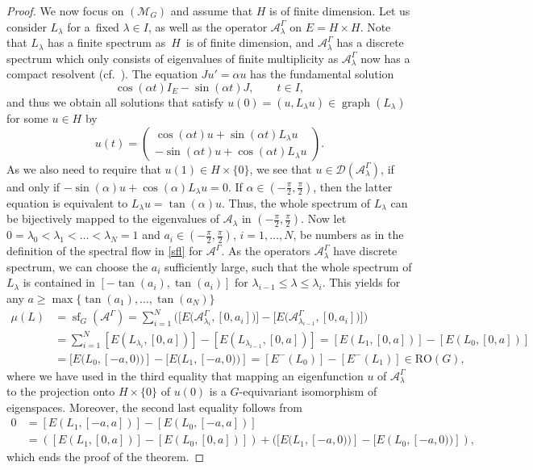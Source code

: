 \documentclass[pdftex]{sigma}
\numberwithin{equation}{section}
\theoremstyle{definition}
\DeclareMathOperator{\sfl}{sf}
\DeclareMathOperator{\gra}{graph}
\begin{document}
\begin{proof}
We now focus on $(\mathcal{M}_G)$ and assume that $H$ is of finite dimension. Let us consider $L_\lambda$ for a~fixed $\lambda\in I$, as well as the operator $\mathcal{A}^\Gamma_\lambda$ on $E=H\times H$. Note that $L_\lambda$ has a finite spectrum as~$H$~is of finite dimension, and $\mathcal{A}^\Gamma_\lambda$ has a discrete spectrum which only consists of eigenvalues of finite multiplicity as $\mathcal{A}^\Gamma_\lambda$ now has a compact resolvent (cf.\ \cite{Cappell}). The equation $Ju'=\alpha u$ has the fundamental solution
\[\cos(\alpha t)I_E-\sin(\alpha t)J,\qquad t\in I,\]
and thus we obtain all solutions that satisfy $u(0)=(u,L_\lambda u)\in\gra(L_\lambda)$ for some $u\in H$ by
\[u(t)=\begin{pmatrix}
\cos(\alpha t)u+\sin(\alpha t)L_\lambda u\\
-\sin(\alpha t)u+\cos(\alpha t) L_\lambda u
\end{pmatrix}.\]
As we also need to require that $u(1)\in H\times\{0\}$, we see that $u\in\mathcal{D}(\mathcal{A}^\Gamma_\lambda)$, if and only if $-\sin(\alpha) u+\cos(\alpha) L_\lambda u=0$. If $\alpha\in(-\frac{\pi}{2},\frac{\pi}{2})$, then the latter equation is equivalent to $L_\lambda u=\tan(\alpha) u$. Thus, the whole spectrum of $L_\lambda$ can be bijectively mapped to the eigenvalues of $\mathcal{A}_\lambda$ in $(-\frac{\pi}{2},\frac{\pi}{2})$. Now let $0=\lambda_0<\lambda_1<\dots<\lambda_N=1$ and $a_i\in(-\frac{\pi}{2},\frac{\pi}{2})$, $i=1,\dots,N$, be numbers as in the definition of the spectral flow in \eqref{sfl} for $\mathcal{A}^\Gamma$. As the operators $\mathcal{A}^\Gamma_\lambda$ have discrete spectrum, we can choose the $a_i$ sufficiently large, such that the whole spectrum of $L_\lambda$ is contained in $[-\tan(a_i),\tan(a_i)]$ for $\lambda_{i-1}\leq\lambda\leq\lambda_i$. This yields for any $a\geq\max\{\tan(a_1),\dots,\tan(a_N)\}$
\begin{align*}
\mu(L)&=\sfl_G(\mathcal{A}^\Gamma)=\sum^N_{i=1}{\bigl(\bigl[E\bigl(\mathcal{A}^\Gamma_{\lambda_i},[0,a_i]\bigr)\bigr] -\bigl[E\bigl(\mathcal{A}^\Gamma_{\lambda_{i-1}},[0,a_i]\bigr)\bigr]\bigr)}\\
&=\sum^N_{i=1}{[E(L_{\lambda_i},[0,a])]-[E(L_{\lambda_{i-1}},[0,a])]}=[E(L_{1},[0,a])]-[E(L_{0},[0,a])]\\
&=[E(L_{0},[-a,0))]-[E(L_{1},[-a,0))]=[E^-(L_0)]-[E^-(L_1)]\in \mathrm{RO}(G),
\end{align*}
where we have used in the third equality that mapping an eigenfunction $u$ of $\mathcal{A}^\Gamma_\lambda$ to the projection onto $H\times\{0\}$ of $u(0)$ is a $G$-equivariant isomorphism of eigenspaces. Moreover, the second last equality follows from
\begin{align*}
0&=[E(L_{1},[-a,a])]-[E(L_{0},[-a,a])]\\
&=([E(L_{1},[0,a])]-[E(L_{0},[0,a])])+([E(L_{1},[-a,0))]-[E(L_{0},[-a,0))]),
\end{align*}
which ends the proof of the theorem.
\end{proof}
\end{document}
